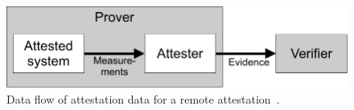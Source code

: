 \begin{figure}[htpb]
  \centering
  \includegraphics[width=0.75\linewidth]{figures/remote_attestation.pdf}
  \caption{Data flow of attestation data for a remote attestation~\cite{rfc9334}.}\label{fig:ra}
\end{figure}
